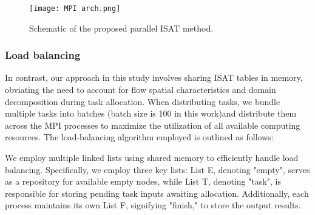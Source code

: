 
\begin{figure}[htbp]
	\centering
	\texttt{[image: MPI arch.png]}
	\caption{Schematic of the proposed parallel ISAT method.}
	\label{MPI_arch2}
\end{figure}

\subsubsection{Load balancing}



In contrast, our approach in this study involves sharing ISAT tables in memory, obviating the need to account for flow spatial characteristics and domain decomposition during task allocation. When distributing tasks, we bundle multiple tasks into batches (batch size is 100 in this work)and distribute them across the MPI processes to maximize the utilization of all available computing resources. The load-balancing algorithm employed is outlined as follows:



We employ multiple linked lists using shared memory to efficiently handle load balancing. Specifically, we employ three key lists: List E, denoting "empty", serves as a repository for available empty nodes, while List T, denoting "task", is responsible for storing pending task inputs awaiting allocation. Additionally, each process maintains its own List F, signifying "finish," to store the output results.


